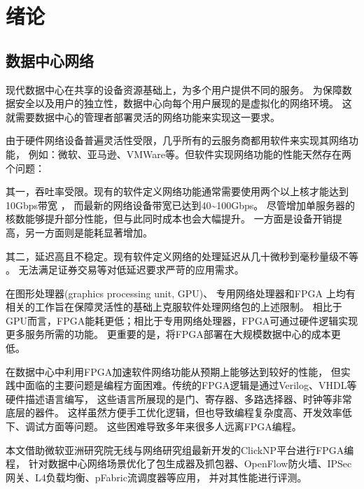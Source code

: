 \chapter{绪论}
\section{数据中心网络}
现代数据中心在共享的设备资源基础上，为多个用户提供不同的服务。
为保障数据安全以及用户的独立性，数据中心向每个用户展现的是虚拟化的网络环境。
这就需要数据中心的管理者部署灵活的网络功能来实现这一要求。

由于硬件网络设备普遍灵活性受限，几乎所有的云服务商都用软件来实现其网络功能，
例如：微软、亚马逊、VMWare等\cite{azure, 179731}。但软件实现网络功能的性能天然存在两个问题：

其一，吞吐率受限。现有的软件定义网络功能通常需要使用两个以上核才能达到10Gbps带宽
\cite{Martins:2014:CAN:2616448.2616491,180672}，
而最新的网络设备带宽已达到40\textasciitilde 100Gbps\cite{edr}。
尽管增加单服务器的核数能够提升部分性能，但与此同时成本也会大幅提升。
一方面是设备开销提高，另一方面则是能耗显著增加。

其二，延迟高且不稳定。现有软件定义网络的处理延迟从几十微秒到毫秒量级不等
\cite{Gandhi:2014:DCS:2619239.2626317, Martins:2014:CAN:2616448.2616491, Gandhi:2014:DCS:2619239.2626317}。
无法满足证券交易等对低延迟要求严苛的应用需求。

在图形处理器(graphics processing unit, GPU)\cite{Han:2010:PGS:1851275.1851207}、
专用网络处理器\cite{cavium, netronome}和FPGA\cite{sigcomm2015keynote, Naous:2008:NRR:1397718.1397720}
上均有相关的工作旨在保障灵活性的基础上克服软件处理网络包的上述限制。
相比于GPU而言，FPGA能耗更低\cite{5681761, 5572788}；相比于专用网络处理器，FPGA可通过硬件逻辑实现更多服务所需的功能。
更重要的是，将FPGA部署在大规模数据中心的成本更低\cite{sigcomm2015keynote,6853195}。

在数据中心中利用FPGA加速软件网络功能从预期上能够达到较好的性能，
但实践中面临的主要问题是编程方面困难。传统的FPGA逻辑是通过Verilog、VHDL等硬件描述语言编写，
这些语言所展现的是门、寄存器、多路选择器、时钟等非常底层的器件。
这样虽然方便手工优化逻辑，但也导致编程复杂度高、开发效率低下、调试方面等问题。
这些困难导致多年来很多人远离FPGA编程\cite{Bacon:2013:FPM:2436256.2436271}。

本文借助微软亚洲研究院无线与网络研究组最新开发的ClickNP平台\cite{clicknp}进行FPGA编程，
针对数据中心网络场景优化了包生成器及抓包器、OpenFlow防火墙、IPSec网关、L4负载均衡、pFabric流调度器等应用，
并对其性能进行评测。

